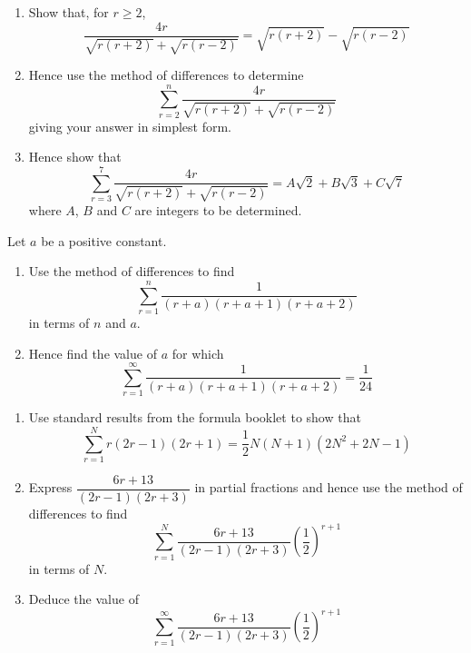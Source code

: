\documentclass[leqno]{article}
\begin{document}
\begin{enumerate}[
  label=\textbf{\arabic*.},
  leftmargin=*,
  topsep=0pt,
  partopsep=0pt,
  parsep=0pt
]
\begin{enumerate}[label=\textbf{(\alph*)}]
  \item Show that, for $r \ge 2$,
  \[
  \frac{4r}{\sqrt{r(r+2)}+\sqrt{r(r-2)}}=\sqrt{r(r+2)}-\sqrt{r(r-2)}
  \]
  \item Hence use the method of differences to determine
  \[
  \sum_{r=2}^{n} \frac{4r}{\sqrt{r(r+2)}+\sqrt{r(r-2)}}
  \]
  giving your answer in simplest form.  \\
  \item Hence show that
  \[
  \sum_{r=3}^{7} \frac{4r}{\sqrt{r(r+2)}+\sqrt{r(r-2)}} = A\sqrt{2}+B\sqrt{3}+C\sqrt{7}
  \]
  where $A$, $B$ and $C$ are integers to be determined.  \\
\end{enumerate}

\newpage

\questionitem

Let $a$ be a positive constant. \\
\begin{enumerate}[label=\textbf{(\alph*)}]
  \item Use the method of differences to find
  \[
  \sum_{r=1}^{n} \frac{1}{(r+a)(r+a+1)(r+a+2)}
  \]
  in terms of $n$ and $a$.  \\
  \item Hence find the value of $a$ for which
  \[
  \sum_{r=1}^{\infty} \frac{1}{(r+a)(r+a+1)(r+a+2)} = \frac{1}{24}
  \]
\end{enumerate}

\newpage

\questionitem

\begin{enumerate}[label=\textbf{(\alph*)}]
  \item Use standard results from the formula booklet to show that
  \[
  \sum_{r=1}^{N} r(2r-1)(2r+1)=\frac{1}{2}N(N+1)(2N^2+2N-1)
  \]
  \item Express $\dfrac{6r+13}{(2r-1)(2r+3)}$ in partial fractions and hence use the method of differences to find
  \[
  \sum_{r=1}^{N} \frac{6r+13}{(2r-1)(2r+3)}\left(\frac{1}{2}\right)^{r+1}
  \]
  in terms of $N$.  \\
  \item Deduce the value of
  \[
  \sum_{r=1}^{\infty} \frac{6r+13}{(2r-1)(2r+3)}\left(\frac{1}{2}\right)^{r+1}
  \]
\end{enumerate}


\end{enumerate}
\end{document}
